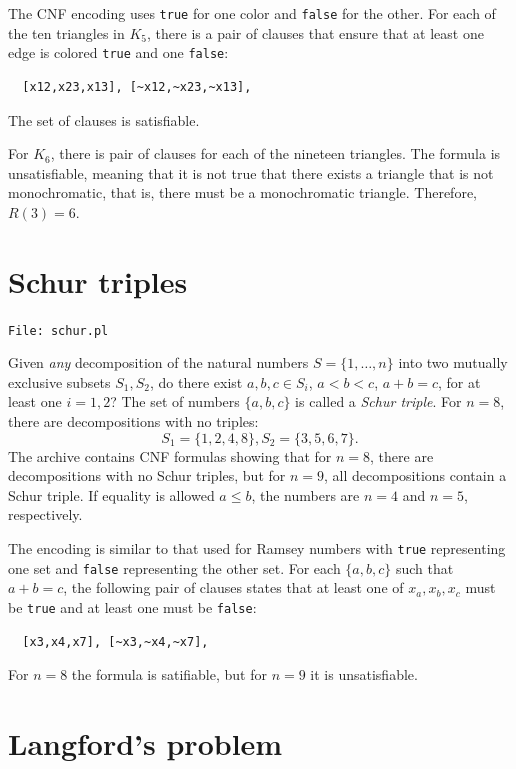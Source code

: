 \documentclass[11pt]{report}
\newcommand*{\p}[1]{\textup{\texttt{#1}}}
\newcommand*{\fl}[1]{\parbox{\textwidth}{\raggedleft \p{File: #1}}}
\begin{document}
The CNF encoding uses \p{true} for one color and \p{false} for the other. For each of the ten triangles in $K_5$, there is a pair of clauses that ensure that at least one edge is colored \p{true} and one \p{false}:
\begin{verbatim}
  [x12,x23,x13], [~x12,~x23,~x13],
\end{verbatim}
The set of clauses is satisfiable.

For $K_6$, there is pair of clauses for each of the nineteen triangles. The formula is unsatisfiable, meaning that it is not true that there exists a triangle that is not monochromatic, that is, there must be a monochromatic triangle. Therefore, $R(3) = 6$.
	

\section{Schur triples}

\fl{schur.pl}

Given \emph{any} decomposition of the natural numbers $S=\{1,\ldots,n\}$ into two mutually exclusive subsets $S_1,S_2$, do there exist $a,b,c\in S_i$, $a<b<c$, $a+b=c$, for at least one $i=1,2$? The set of numbers $\{a,b,c\}$ is called a \emph{Schur triple}. For $n=8$, there are decompositions with no triples:
\[
S_1 = \{1,2,4,8\}, S_2 = \{3,5,6,7\}.
\]
The archive contains CNF formulas showing that for $n=8$, there are decompositions with no Schur triples, but for $n=9$, all decompositions contain a Schur triple. If equality is allowed $a\leq b$, the numbers are $n=4$ and $n=5$, respectively.

The encoding is similar to that used for Ramsey numbers with \p{true} representing one set and \p{false} representing the other set. For each $\{a,b,c\}$ such that $a+b=c$, the following pair of clauses states that at least one of $x_a,x_b,x_c$ must be \p{true} and at least one must be \p{false}:
\begin{verbatim}
  [x3,x4,x7], [~x3,~x4,~x7],
\end{verbatim}
For $n=8$ the formula is satifiable, but for $n=9$ it is unsatisfiable.


\section{Langford's problem}
\end{document}
